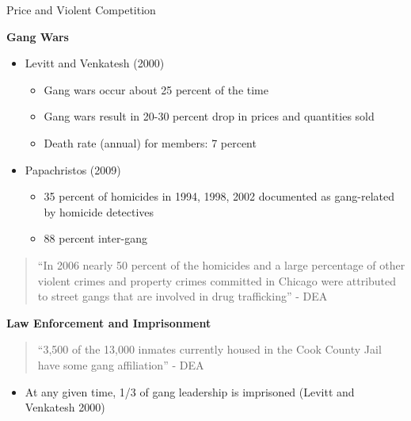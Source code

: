 \documentclass[10pt,ignorenonframetext,]{beamer}
\providecommand{\tightlist}{%
  \setlength{\itemsep}{0pt}\setlength{\parskip}{0pt}}
\begin{document}
\begin{frame}{Price and Violent Competition}
\protect\hypertarget{price-and-violent-competition}{}

\textbf{Gang Wars}

\begin{itemize}
\tightlist
\item
  Levitt and Venkatesh (2000)

  \begin{itemize}
  \tightlist
  \item
    Gang wars occur about 25 percent of the time
  \item
    Gang wars result in 20-30 percent drop in prices and quantities sold
  \item
    Death rate (annual) for members: 7 percent
  \end{itemize}
\item
  Papachristos (2009)

  \begin{itemize}
  \tightlist
  \item
    35 percent of homicides in 1994, 1998, 2002 documented as
    gang-related by homicide detectives
  \item
    88 percent inter-gang
  \end{itemize}
\end{itemize}

\begin{quote}
``In 2006 nearly 50 percent of the homicides and a large percentage of
other violent crimes and property crimes committed in Chicago were
attributed to street gangs that are involved in drug trafficking'' - DEA
\end{quote}

\textbf{Law Enforcement and Imprisonment}

\begin{quote}
``3,500 of the 13,000 inmates currently housed in the Cook County Jail
have some gang affiliation'' - DEA
\end{quote}

\begin{itemize}
\tightlist
\item
  At any given time, 1/3 of gang leadership is imprisoned (Levitt and
  Venkatesh 2000)
\end{itemize}

\end{frame}
\end{document}
